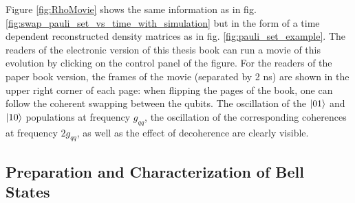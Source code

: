 Figure  \ref{fig:RhoMovie} shows the same information as in fig.  \ref{fig:swap_pauli_set_vs_time_with_simulation} but in the form of a time dependent reconstructed density matrices as in fig. \ref{fig:pauli_set_example}. The readers of the electronic version of this thesis book can run a movie of this evolution by clicking on the control panel of the figure. For the readers of the paper book version, the frames of the movie (separated by 2 ns) are shown in the upper right corner of each page: when flipping the pages of the book, one can follow the coherent swapping between the qubits. The oscillation of the $\left| 01 \right>$ and $\left| 10 \right>$ populations at frequency $g_{qq}$, the oscillation of the corresponding coherences at frequency $2g_{qq}$, as well as the effect of decoherence are clearly visible.


\subsection{Preparation and Characterization of Bell States}\label{section:Bell_states}

